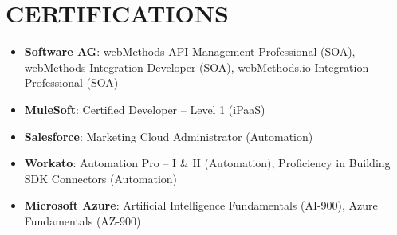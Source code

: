 \documentclass[letterpaper,11pt]{article}
\newcommand{\resumeItem}[1]{
  \item\small{
    {#1 \vspace{-1pt}}
  }
}
\newcommand{\resumeItemListStart}{\begin{itemize}[leftmargin=0.1in]}
\newcommand{\resumeItemListEnd}{\end{itemize}\vspace{-5pt}}
\begin{document}
\section{\color{airforceblue}CERTIFICATIONS}    
    \resumeItemListStart
        \vspace{0.5pt}
        \resumeItem{\normalsize{\textbf{Software AG}: webMethods API Management Professional (SOA), webMethods Integration Developer (SOA), webMethods.io Integration Professional (SOA)}}
        \vspace{-5pt}
        
        \resumeItem{\normalsize{\textbf{MuleSoft}: Certified Developer -- Level 1 (iPaaS)}}
        \vspace{-5pt}

        \resumeItem{\normalsize{\textbf{Salesforce}: Marketing Cloud Administrator (Automation)}}
        \vspace{-5pt}

        \resumeItem{\normalsize{\textbf{Workato}: Automation Pro -- I \& II (Automation), Proficiency in Building SDK Connectors (Automation)}}
        \vspace{-5pt}

        \resumeItem{\normalsize{\textbf{Microsoft Azure}: Artificial Intelligence Fundamentals (AI-900), Azure Fundamentals (AZ-900)}}
        
    \resumeItemListEnd  
\end{document}

